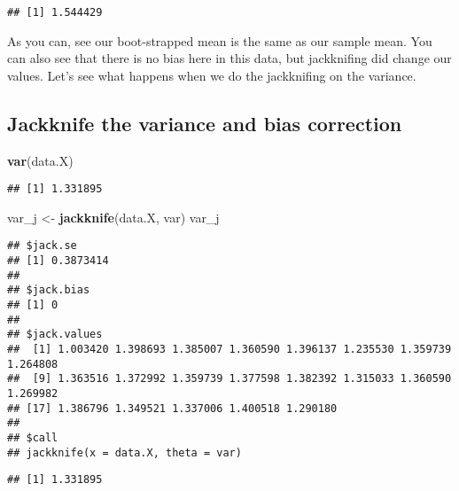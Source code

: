 \documentclass[
]{article}
\newenvironment{Shaded}{\begin{snugshade}}{\end{snugshade}}
\newcommand{\FunctionTok}[1]{\textcolor[rgb]{0.13,0.29,0.53}{\textbf{#1}}}
\newcommand{\NormalTok}[1]{#1}
\newcommand{\OtherTok}[1]{\textcolor[rgb]{0.56,0.35,0.01}{#1}}
\newcommand{\SpecialCharTok}[1]{\textcolor[rgb]{0.81,0.36,0.00}{\textbf{#1}}}
\begin{document}
\begin{verbatim}
## [1] 1.544429
\end{verbatim}

As you can, see our boot-strapped mean is the same as our sample mean.
You can also see that there is no bias here in this data, but
jackknifing did change our values. Let's see what happens when we do the
jackknifing on the variance.

\subsection{Jackknife the variance and bias
correction}\label{jackknife-the-variance-and-bias-correction}

\begin{Shaded}
\begin{Highlighting}[]
\FunctionTok{var}\NormalTok{(data.X)}
\end{Highlighting}
\end{Shaded}

\begin{verbatim}
## [1] 1.331895
\end{verbatim}

\begin{Shaded}
\begin{Highlighting}[]
\NormalTok{var\_j }\OtherTok{\textless{}{-}} \FunctionTok{jackknife}\NormalTok{(data.X, var)}
\NormalTok{var\_j}
\end{Highlighting}
\end{Shaded}

\begin{verbatim}
## $jack.se
## [1] 0.3873414
## 
## $jack.bias
## [1] 0
## 
## $jack.values
##  [1] 1.003420 1.398693 1.385007 1.360590 1.396137 1.235530 1.359739 1.264808
##  [9] 1.363516 1.372992 1.359739 1.377598 1.382392 1.315033 1.360590 1.269982
## [17] 1.386796 1.349521 1.337006 1.400518 1.290180
## 
## $call
## jackknife(x = data.X, theta = var)
\end{verbatim}

\begin{Shaded}
\end{Shaded}

\begin{verbatim}
## [1] 1.331895
\end{verbatim}
\end{document}
